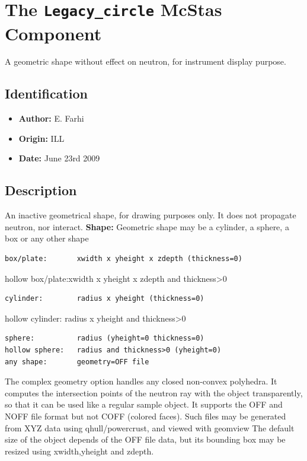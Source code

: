 \section{The \texttt{Legacy\_circle} McStas Component}
A geometric shape without effect on neutron, for instrument display purpose.

\subsection*{Identification}
\begin{itemize}
  \item \textbf{Author:} E. Farhi
  \item \textbf{Origin:} ILL
  \item \textbf{Date:} June 23rd 2009
\end{itemize}

\subsection*{Description}
An inactive geometrical shape, for drawing purposes only. It does not propagate neutron, nor interact. \textbf{Shape:} Geometric shape may be a cylinder, a sphere, a box or any other shape

\begin{verbatim}
box/plate:       xwidth x yheight x zdepth (thickness=0)
\end{verbatim}

hollow box/plate:xwidth x yheight x zdepth and thickness\textgreater{}0

\begin{verbatim}
cylinder:        radius x yheight (thickness=0)
\end{verbatim}

hollow cylinder: radius x yheight and thickness\textgreater{}0

\begin{verbatim}
sphere:          radius (yheight=0 thickness=0)
hollow sphere:   radius and thickness>0 (yheight=0)
any shape:       geometry=OFF file
\end{verbatim}

The complex geometry option handles any closed non-convex polyhedra. It computes the intersection points of the neutron ray with the object transparently, so that it can be used like a regular sample object. It supports the OFF and NOFF file format but not COFF (colored faces). Such files may be generated from XYZ data using qhull/powercrust, and viewed with geomview The default size of the object depends of the OFF file data, but its bounding box may be resized using xwidth,yheight and zdepth.

